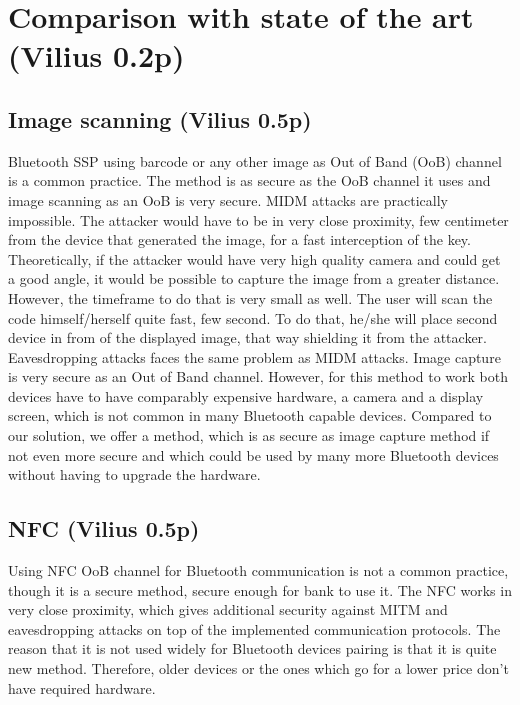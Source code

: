 \documentclass[12pt]{article}
\begin{document}
\newpage

\section{Comparison with state of the art (Vilius 0.2p)}
\label{sec:Comparison with state of the art}

\subsection{Image scanning (Vilius 0.5p)}
\label{sub:Image scanning}

Bluetooth SSP using barcode or any other image as Out of Band (OoB) channel is a common practice. The method is as secure as the OoB channel it uses and image scanning as an OoB is very secure. MIDM attacks are practically impossible. The attacker would have to be in very close proximity, few centimeter from the device that generated the image, for a fast interception of the key. Theoretically, if the attacker would have very high quality camera and could get a good angle, it would be possible to capture the image from a greater distance. However, the timeframe to do that is very small as well. The user will scan the code himself/herself quite fast, few second. To do that, he/she will place second device in from of the displayed image, that way shielding it from the attacker. Eavesdropping attacks faces the same problem as MIDM attacks.
Image capture is very secure as an Out of Band channel. However, for this method to work both devices have to have comparably expensive hardware, a camera and a display screen, which is not common in many Bluetooth capable devices. Compared to our solution, we offer a method, which is as secure as image capture method if not even more secure and which could be used by many more Bluetooth devices without having to upgrade the hardware.


\subsection{NFC (Vilius 0.5p)}
\label{sub:Image scanning}

Using NFC OoB channel for Bluetooth communication is not a common practice, though it is a secure method, secure enough for bank to use it. The NFC works in very close proximity, which gives additional security against MITM and eavesdropping attacks on top of the implemented communication protocols. The reason that it is not used widely for Bluetooth devices pairing is that it is quite new method. Therefore, older devices or the ones which go for a lower price don’t have required hardware.
\end{document}
